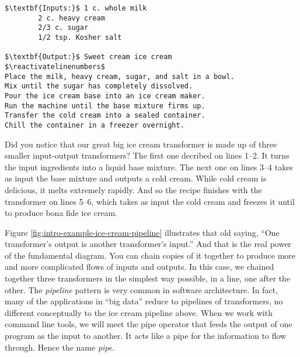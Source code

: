 \suppresslinenumbers
\begin{lstlisting}[caption={\label{listing:intro-ice-cream} Ice cream transformer. It's as short as it is sweet.}, escapeinside=$$, firstnumber=0]
$\textbf{Inputs:}$ 1 c. whole milk
        2 c. heavy cream
        2/3 c. sugar
        1/2 tsp. Kosher salt

$\textbf{Output:}$ Sweet cream ice cream
$\reactivatelinenumbers$
Place the milk, heavy cream, sugar, and salt in a bowl.
Mix until the sugar has completely dissolved.
Pour the ice cream base into an ice cream maker.
Run the machine until the base mixture firms up.
Transfer the cold cream into a sealed container.
Chill the container in a freezer overnight.
\end{lstlisting}

Did you notice that our great big ice cream transformer is made up of three smaller input-output transformers? The first one decribed on lines 1--2. It turns the input ingredients into a liquid base mixture. The next one on lines 3--4 takes as input the base mixture and outputs a cold cream. While cold cream is delicious, it melts extremely rapidly. And so the recipe finishes with the transformer on lines 5--6, which takes as input the cold cream and freezes it until to produce bona fide ice cream.

\begin{figure*}[h]
  
  \caption{\label{fig:intro-example-ice-cream-pipeline} The steps inside transformers are often simpler transformers. The transfromation that produces ice cream from ingredients is made up of three successive transformers. The output of one transformer is the input to the next transformer.}
\end{figure*}

Figure \ref{fig:intro-example-ice-cream-pipeline} illustrates that old saying, ``One transformer's output is another transformer's input.'' And that is the real power of the fundamental diagram. You can chain copies of it together to produce more and more complicated flows of inputs and outputs. In this case, we chained together three transformers in the simplest way possible, in a line, one after the other. The \emph{pipeline} pattern is very common in software architecture. In fact, many of the applications in ``big data'' reduce to pipelines of transformers, no different conceptually to the ice cream pipeline above. When we work with command line tools, we will meet the pipe operator that feeds the output of one program as the input to another. It acts like a pipe for the information to flow through. Hence the name \emph{pipe}.

